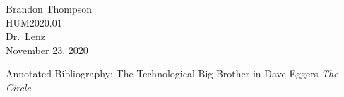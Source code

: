 \noindent
Brandon Thompson \\
HUM2020.01 \\
Dr.\ Lenz \\
November 23, 2020 \\

\begin{center}
Annotated Bibliography: The Technological Big Brother in Dave Eggers {\it The Circle}
\end{center}